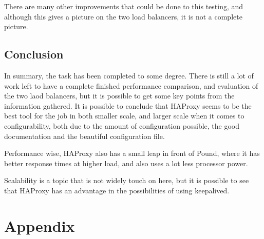 There are many other improvements that could be done to this testing, and
although this gives a picture on the two load balancers, it is not a complete
picture.

\subsection{Conclusion}
In summary, the task has been completed to some degree. There is still a lot of
work left to have a complete finished performance comparison, and evaluation of
the two laod balancers, but it is possible to get some key points from the
information gathered. 
It is possible to conclude that HAProxy seems to be the best tool for the job
in both smaller scale, and larger scale when it comes to configurability, both
due to the amount of configuration possible, the good documentation and the
beautiful configuration file.

Performance wise, HAProxy also has a small leap in front of Pound, where it has
better response times at higher load, and also uses a lot less processor power. 

Scalability is a topic that is not widely touch on here, but it is possible to
see that HAProxy has an advantage in the possibilities of using keepalived.

\section{Appendix}
\begin{center}









\end{center}
